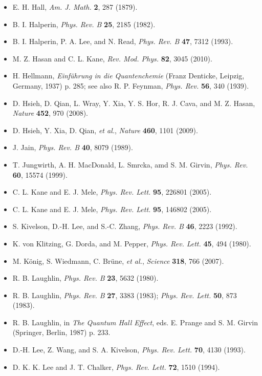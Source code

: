 \begin{itemize}[leftmargin=2em,itemsep=0pt,parsep=0pt,label={}]
\item [H1879] E. H. Hall, \emph{Am. J. Math.} \textbf{2}, 287 (1879).
\item [H1982] B. I. Halperin, \emph{Phys. Rev. B} \textbf{25}, 2185 (1982).
\item [HLR1993] B. I. Halperin, P. A. Lee, and N. Read, \emph{Phys. Rev. B} \textbf{47}, 7312 (1993).
\item [HK2010] M. Z. Hasan and C. L. Kane, \emph{Rev. Mod. Phys.} \textbf{82}, 3045 (2010).
\item [H1937] H. Hellmann, \emph{Einführung in die Quantenchemie} (Franz Denticke, Leipzig, Germany, 1937) p. 285; see also R. P. Feynman, \emph{Phys. Rev.} \textbf{56}, 340 (1939).
\item [H2008] D. Hsieh, D. Qian, L. Wray, Y. Xia, Y. S. Hor, R. J. Cava, and M. Z. Hasan, \emph{Nature} \textbf{452}, 970 (2008).
\item [H2009] D. Hsieh, Y. Xia, D. Qian, \emph{et al.}, \emph{Nature} \textbf{460}, 1101 (2009).
\item [J1989] J. Jain, \emph{Phys. Rev. B} \textbf{40}, 8079 (1989).
\item [J1999] T. Jungwirth, A. H. MacDonald, L. Smrcka, amd S. M. Girvin, \emph{Phys. Rev.} \textbf{60}, 15574 (1999).
\item [KM2005a] C. L. Kane and E. J. Mele, \emph{Phys. Rev. Lett.} \textbf{95}, 226801 (2005).
\item [KM2005b] C. L. Kane and E. J. Mele, \emph{Phys. Rev. Lett.} \textbf{95}, 146802 (2005).
\item [KLZ1992] S. Kivelson, D.-H. Lee, and S.-C. Zhang, \emph{Phys. Rev. B} \textbf{46}, 2223 (1992).
\item [KDP1980] K. von Klitzing, G. Dorda, and M. Pepper, \emph{Phys. Rev. Lett.} \textbf{45}, 494 (1980).
\item [K2007] M. König, S. Wiedmann, C. Brüne, \emph{et al.}, \emph{Science} \textbf{318}, 766 (2007).
\item [L1980] R. B. Laughlin, \emph{Phys. Rev. B} \textbf{23}, 5632 (1980).
\item [L1983] R. B. Laughlin, \emph{Phys. Rev. B} \textbf{27}, 3383 (1983); \emph{Phys. Rev. Lett.} \textbf{50}, 873 (1983).
\item [L1987] R. B. Laughlin, in \emph{The Quantum Hall Effect}, eds. E. Prange and S. M. Girvin (Springer, Berlin, 1987) p. 233.
\item [LWK1993] D.-H. Lee, Z. Wang, and S. A. Kivelson, \emph{Phys. Rev. Lett.} \textbf{70}, 4130 (1993).
\item [LC1994] D. K. K. Lee and J. T. Chalker, \emph{Phys. Rev. Lett.} \textbf{72}, 1510 (1994).

\end{itemize}
